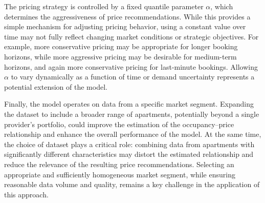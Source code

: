 The pricing strategy is controlled by a fixed quantile parameter $\alpha$, which determines the aggressiveness of price recommendations. While this provides a simple mechanism for adjusting pricing behavior, using a constant value over time may not fully reflect changing market conditions or strategic objectives. For example, more conservative pricing may be appropriate for longer booking horizons, while more aggressive pricing may be desirable for medium-term horizons, and again more conservative pricing for last-minute bookings. Allowing $\alpha$ to vary dynamically as a function of time or demand uncertainty represents a potential extension of the model.

Finally, the model operates on data from a specific market segment. Expanding the dataset to include a broader range of apartments, potentially beyond a single provider's portfolio, could improve the estimation of the occupancy–price relationship and enhance the overall performance of the model. At the same time, the choice of dataset plays a critical role: combining data from apartments with significantly different characteristics may distort the estimated relationship and reduce the relevance of the resulting price recommendations. Selecting an appropriate and sufficiently homogeneous market segment, while ensuring reasonable data volume and quality, remains a key challenge in the application of this approach.